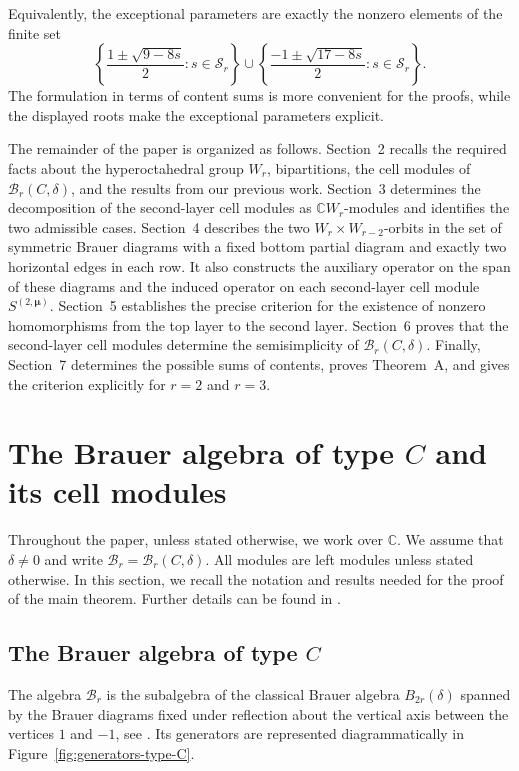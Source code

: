 \documentclass[10pt,a4paper]{amsart}
\newcommand{\C}{\mathbb{C}}
\newcommand{\1}{\mathfrak{1}}
\newcommand{\B}{\mathcal{B}}
\begin{document}
Equivalently, the exceptional parameters are exactly the nonzero elements of the finite set
$$
 \left\{\frac{1\pm\sqrt{9-8s}}{2}:s\in\mathscr S_r\right\}
 \cup
 \left\{\frac{-1\pm\sqrt{17-8s}}{2}:s\in\mathscr S_r\right\}.
$$
The formulation in terms of content sums is more convenient for the proofs, while the displayed roots make the exceptional parameters explicit.

The remainder of the paper is organized as follows.
Section~2 recalls the required facts about the hyperoctahedral
group $W_r$, bipartitions, the cell modules of $\B_r(C,\delta)$,
and the results from our previous work. Section~3 determines
the decomposition of the second-layer cell modules as
$\C W_r$-modules and identifies the two admissible cases.
Section~4 describes the two $W_r\times W_{r-2}$-orbits
in the set of symmetric Brauer diagrams with a fixed bottom
partial diagram and exactly two horizontal edges in each row.
It also constructs the auxiliary operator on the span of
these diagrams and the induced operator on each second-layer
cell module $S^{(2,\bm\mu)}$.
Section~5 establishes the precise criterion for the existence
of nonzero homomorphisms from the top layer to the second layer.
Section~6 proves that the second-layer cell modules determine
the semisimplicity of $\B_r(C,\delta)$. Finally, Section~7
determines the possible sums of contents, proves Theorem~A,
and gives the criterion explicitly for $r=2$ and $r=3$.

\section{The Brauer algebra of type $C$ and its cell modules}
\label{sec:background}

Throughout the paper, unless stated otherwise, we work over $\C$. We assume that $\delta\neq0$ and write $\B_r=\B_r(C,\delta)$. All modules are left modules unless stated otherwise. In this section, we recall the notation and results needed for the proof of the main theorem. Further details can be found in \cite{Bo12,CLY12,KCTprevious}.

\subsection{The Brauer algebra of type $C$}

The algebra $\B_r$ is the subalgebra of the classical Brauer algebra $B_{2r}(\delta)$ spanned by the Brauer diagrams fixed under reflection about the vertical axis between the vertices $1$ and $-1$, see \cite{CLY12}. Its generators are represented diagrammatically in Figure~\ref{fig:generators-type-C}.
\end{document}
